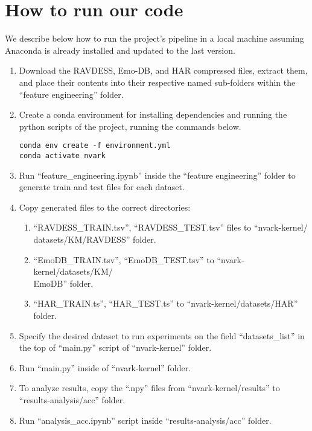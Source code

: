 \chapter{How to run our code} \label{app:A}
We describe below how to run the project's pipeline in a local machine assuming Anaconda is already installed and updated to the last version.
\begin{enumerate}
 \item Download the RAVDESS, Emo-DB, and HAR compressed files, extract them, and place their contents into their respective named sub-folders within the ``feature engineering'' folder.
\item Create a conda environment for installing dependencies and running the python scripts of the project, running the commands below.
\begin{verbatim}
conda env create -f environment.yml
conda activate nvark
\end{verbatim}

\item Run ``feature\_engineering.ipynb'' inside the ``feature engineering'' folder to generate train and test files for each dataset.
\item Copy generated files to the correct directories: 
\begin{enumerate}
 \item ``RAVDESS\_TRAIN.tsv'', ``RAVDESS\_TEST.tsv'' files to ``nvark-kernel/\\datasets/KM/RAVDESS'' folder.
\item ``EmoDB\_TRAIN.tsv'', ``EmoDB\_TEST.tsv'' to ``nvark-kernel/datasets/KM/\\EmoDB'' folder.
\item ``HAR\_TRAIN.ts'', ``HAR\_TEST.ts'' to ``nvark-kernel/datasets/HAR'' folder.
\end{enumerate}
\item Specify the desired dataset to run experiments on the field ``datasets\_list'' in the top of ``main.py'' script of ``nvark-kernel'' folder. 
\item Run ``main.py'' inside of ``nvark-kernel'' folder.
\item To analyze results, copy the ``.npy'' files from ``nvark-kernel/results'' to ``results-analysis/acc'' folder.
\item Run ``analysis\_acc.ipynb'' script inside ``results-analysis/acc'' folder.
    
\end{enumerate}